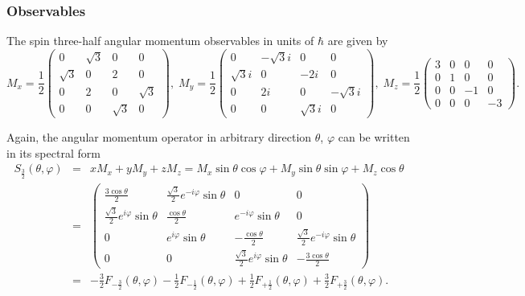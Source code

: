 \documentclass[fleqn,twoside]{article}      %
\begin{document}
\subsubsection*{Observables}
The spin three-half angular momentum observables in units of $\hbar$ are given by~\cite{schiff-55}
\begin{equation}
M_x=
\frac{1}{2}
\left(
\begin{array}{cccccccccc}
0&\sqrt{3}&0&0\\
\sqrt{3}&0&2&0\\
0&2&0&\sqrt{3}\\
0&0&\sqrt{3}&0
\end{array}
\right),
\;
M_y=
\frac{1}{2}
\left(
\begin{array}{ccccccccccr}
0&-\sqrt{3}i&0&0\\
\sqrt{3}i&0&-2i&0\\
0&2i&0&-\sqrt{3}i\\
0&0&\sqrt{3}i&0
\end{array}
\right),
\;
M_z=
\frac{1}{2}
\left(
\begin{array}{cccccccccc}
3&0&0&0\\
0&1&0&0\\
0&0&-1&0\\
0&0&0&-3
\end{array}
\right).
\end{equation}

Again, the angular momentum operator in arbitrary direction $\theta$, $\varphi$ can be written in its spectral form
\begin{equation}
\begin{array}{rcl}
S_\frac{3}{2} (\theta ,\varphi) &=&
xM_x
+
yM_y
+
zM_z
=
 M_x  \sin \theta \cos \varphi
+
M_y   \sin \theta \sin \varphi
+
M_z   \cos \theta
\\
&=&   \left(
\begin{array}{cccc}
 \frac{3 \cos \theta }{2} & \frac{\sqrt{3}}{2}  e^{-i \varphi } \sin \theta  & 0 & 0 \\
 \frac{\sqrt{3}}{2}  e^{i \varphi } \sin \theta  & \frac{\cos \theta }{2} & e^{-i \varphi } \sin \theta  & 0 \\
 0 & e^{i \varphi } \sin \theta  & -\frac{\cos \theta }{2} & \frac{\sqrt{3}}{2}  e^{-i \varphi } \sin \theta  \\
 0 & 0 & \frac{ \sqrt{3}}{2} e^{i \varphi } \sin \theta  & -\frac{3 \cos \theta }{2}
\end{array}
\right)  \\
&=& -\frac{3}{2}F_{-\frac{3}{2}}(\theta ,\varphi) - \frac{1}{2} F_{-\frac{1}{2}}(\theta ,\varphi) +
\frac{1}{2}F_{+\frac{1}{2}}(\theta ,\varphi)+ \frac{3}{2}F_{+\frac{3}{2}}(\theta ,\varphi).
\end{array}
\label{e-2009-gtq-s444}
\end{equation}
\end{document}
